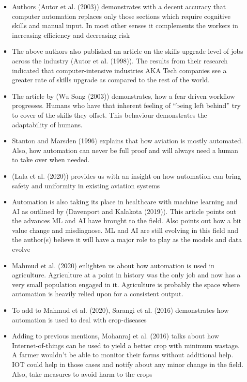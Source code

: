 \documentclass[
  english,
  man]{apa7}
\begin{document}
\begin{itemize}
\item
  Authors (Autor et al. (2003)) demonstrates with a decent accuracy that computer automation replaces only those sections which require cognitive skills and manual input. In most other senses it complements the workers in increasing efficiency and decreasing risk
\item
  The above authors also published an article on the skills upgrade level of jobs across the industry (Autor et al. (1998)). The results from their research indicated that computer-intensive industries AKA Tech companies see a greater rate of skills upgrade as compared to the rest of the world.
\item
  The article by (Wu Song (2003)) demonstrates, how a fear driven workflow progresses. Humans who have that inherent feeling of ``being left behind'' try to cover of the skills they offset. This behaviour demonstrates the adaptability of humans.
\item
  Stanton and Marsden (1996) explains that how aviation is mostly automated. Also, how automation can never be full proof and will always need a human to take over when needed.
\item
  (Lala et al. (2020)) provides us with an insight on how automation can bring safety and uniformity in existing aviation systems
\item
  Automation is also taking its place in healthcare with machine learning and AI as outlined by (Davenport and Kalakota (2019)). This article points out the advances ML and AI have brought to the field. Also points out how a bit value change and misdiagnose. ML and AI are still evolving in this field and the author(s) believe it will have a major role to play as the models and data evolve
\item
  Mahmud et al. (2020) enlighten us about how automation is used in agriculture. Agriculture at a point in history was the only job and now has a very small population engaged in it. Agriculture is probably the space where automation is heavily relied upon for a consistent output.
\item
  To add to Mahmud et al. (2020), Sarangi et al. (2016) demonstrates how automation is used to deal with crop-diseases
\item
  Adding to previous mentions, Mohanraj et al. (2016) talks about how Internet-of-things can be used to yield a better crop with minimum wastage. A farmer wouldn't be able to monitor their farms without additional help. IOT could help in those cases and notify about any minor change in the field. Also, take measures to avoid harm to the crops

\end{itemize}
\end{document}
